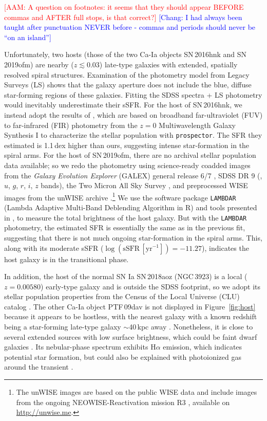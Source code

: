 \documentclass[twocolumn]{aastex631}
\newcommand{\adam}[1]{\textcolor{red}{[AAM: #1]}}
\newcommand{\chang}[1]{\textcolor{blue}{[Chang: #1]}}
\begin{document}
\adam{A question on footnotes: it seems that they should appear BEFORE commas and AFTER full stops, is that correct?} \chang{I had always been taught after punctuation NEVER before - commas and periods should never be ``on an island''}

Unfortunately, two hosts (those of the two Ca-Ia objects SN\,2016hnk and SN\,2019ofm) are nearby ($z \lesssim 0.03$) late-type galaxies with extended, spatially resolved spiral structures. Examination of the photometry model from Legacy Surveys (LS) shows that the galaxy aperture does not include the blue, diffuse star-forming regions of these galaxies. Fitting the SDSS spectra + LS photometry would inevitably underestimate their sSFR. For the host of SN\,2016hnk, we instead adopt the results of \citet{Dong_Ca-rich_2022}, which are based on broadband far-ultraviolet (FUV) to far-infrared (FIR) photometry from the $z=0$ Multiwavelength Galaxy Synthesis I \citep[z0MGS;][]{Leroy_2019} to characterize the stellar population with \texttt{prospector}. The SFR they estimated is 1.1\,dex higher than ours, suggesting intense star-formation in the spiral arms.
For the host of SN\,2019ofm, there are no archival stellar population data available; so we redo the photometry using science-ready coadded images from the \textit{Galaxy Evolution Explorer} (GALEX) general release 6/7 \citep[][$FUV$ and $NUV$ bands]{Martin2005a}, SDSS DR 9 (\citealp{Ahn2012a}, $u$, $g$, $r$, $i$, $z$ bands), the Two Micron All Sky Survey \citep[2MASS;][$H$ and $J$ bands]{Skrutskie2006a}, and preprocessed WISE images \citep{Wright2010a} from the unWISE archive \citep[][$W_1$ and $W_2$ bands]{Lang2014a}.\footnote{The unWISE images are based on the public WISE data and include images from the ongoing NEOWISE-Reactivation mission R3 \citep{Mainzer2014a, Meisner2017a}, available on \href{http://unwise.me}{http://unwise.me}.} We use the software package \texttt{LAMBDAR} (Lambda Adaptive Multi-Band Deblending Algorithm in R) \citep{Wright2016a} and tools presented in \citet{Schulze2021a}, to measure the total brightness of the host galaxy. But with the \texttt{LAMBDAR} photometry, the estimated SFR is essentially the same as in the previous fit, suggesting that there is not much ongoing star-formation in the spiral arms. This, along with its moderate sSFR ($\log (\mathrm{sSFR}\,[\mathrm{yr}^{-1}])=-11.27$), indicates the host galaxy is in the transitional phase.

In addition, the host of the normal SN Ia SN\,2018aoz (NGC\,3923) is a local ($z=0.00580$) early-type galaxy and is outside the SDSS footprint, so we adopt its stellar population properties from the Census of the Local Universe (CLU) catalog \citep{Cook_2019, de_Ca_rich_2020}. The other Ca-Ia object PTF\,09dav is not displayed in Figure~\ref{fig:host} because it appears to be hostless, with the nearest galaxy with a known redshift being a star-forming late-type galaxy $\sim$40\,kpc away \citep{Sullivan_2011}. Nonetheless, it is close to several extended sources with low surface brightness, which could be faint dwarf galaxies \citep[see Figure~3 in][]{Kasliwal_2012}. Its nebular-phase spectrum exhibits H$\alpha$ emission, which indicates potential star formation, but could also be explained with photoionized gas around the transient \citep{Kasliwal_2012}.
\end{document}
